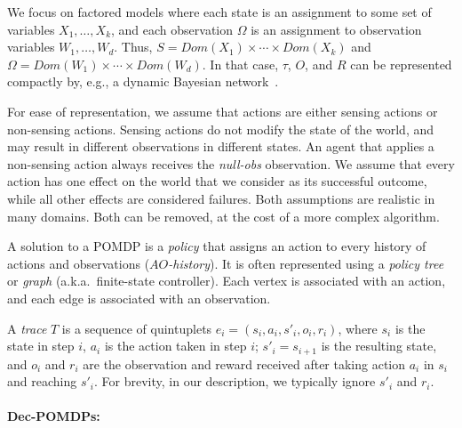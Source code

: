 \documentclass[runningheads]{llncs}
\newcommand{\citep}{\cite}
\begin{document}
We focus on factored models where each state is
an assignment to some set of variables $X_1,\ldots, X_k$, and each observation $\Omega$ 
is an assignment to observation variables $W_1,\ldots, W_d$. 
Thus, $S=Dom(X_1)\times\cdots\times Dom(X_k)$ and
$\Omega = Dom(W_1)\times\cdots\times Dom(W_d)$. 
In that case, $\tau$, $O$, and $R$ can be represented compactly by, e.g., a dynamic Bayesian network~\citep{BAYESNETWORK}. 

For ease of representation, we assume that actions are either sensing actions or non-sensing actions. Sensing actions do not modify the state of the world, and may result in different observations in different states. An agent that applies a non-sensing action always receives the {\em null-obs} observation. We assume that every action has one effect on the world that we consider as its successful outcome, while all other effects are considered failures. Both assumptions are realistic in many domains. Both can be removed, at the cost of a more complex algorithm. 

A solution to a POMDP is a {\em policy} that assigns an action to every history of actions and observations ({\em $AO$-history}). It is often represented using a {\em policy tree} or {\em graph} (a.k.a.~finite-state controller). Each vertex is associated with an action, and each edge is associated with an observation.
 
A {\em trace} $T$ is a sequence of quintuplets $e_i = (s_i, a_i, s'_i, o_i, r_i)$,
where $s_i$ is the state in step $i$, 
$a_i$ is the action taken in step $i$;
    $s'_i=s_{i+1}$ is the resulting state,
    and $o_i$ and $r_i$ are the observation and reward
    received after taking action $a_i$ in $s_i$ and reaching $s'_i$. For brevity,
    in our description, we typically ignore $s'_i$ and $r_i$.


\paragraph{Dec-POMDPs:}
\end{document}
